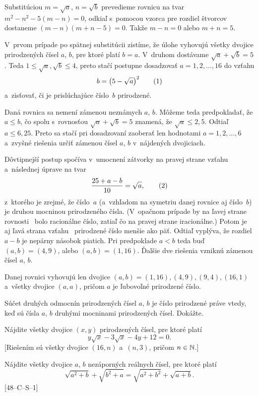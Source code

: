{%
Substitúciou $m=\sqrt a$, $n=\sqrt b$ prevedieme rovnicu na tvar
$m^2-n^2-5(m-n)=0$, odkiaľ s~pomocou vzorca pre rozdiel štvorcov
dostaneme $(m-n)(m+n-5)=0$. Takže $m-n=0$ alebo $m+n=5$.

V~prvom prípade po spätnej substitúcii zistíme, že úlohe vyhovujú
všetky dvojice prirodzených čísel $a$, $b$, pre ktoré platí $b=a$.
V~druhom dostávame $\sqrt a+\sqrt b=5$. Teda $1\le\sqrt a,\sqrt b\le4$,
preto stačí postupne dosadzovať $a=1,2,\dots,16$
do vzťahu
$$
b=\bigl(5-\sqrt a\bigr)^2 \tag1
$$
a~zisťovať, či je prislúchajúce číslo~$b$ prirodzené.

Daná rovnica sa nemení zámenou neznámych $a$, $b$. Môžeme teda
predpokladať, že $a\le b$, čo spolu s~rovnosťou $\sqrt a+\sqrt b=5$
znamená, že $\sqrt a\le2{,}5$. Odtiaľ $a\le6{,}25$. Preto sa stačí
pri dosadzovaní zaoberať len hodnotami $a=1,2,\dots,6$ a~zvyšné
riešenia určiť zámenou čísel $a$, $b$ v~nájdených dvojiciach.

Dôvtipnejší postup spočíva v~umocnení zátvorky na pravej strane
vzťahu~ a~následnej úprave na tvar
$$
{25+a-b\over10}=\sqrt a, \tag2
$$
z~ktorého je zrejmé, že číslo~$a$ (a~vzhľadom na symetriu danej
rovnice aj číslo~$b$) je druhou mocninou prirodzeného čísla.  
(V~opačnom prípade by na ľavej strane rovnosti~ bolo
racionálne číslo, zatiaľ čo na pravej strane iracionálne.) Potom je aj ľavá
strana vzťahu~ prirodzené číslo menšie ako päť. Odtiaľ vyplýva, že
rozdiel $a-b$ je nepárny násobok piatich. Pri predpoklade $a<b$ teda
buď $(a,b)=(4,9)$, alebo $(a,b)=(1,16)$. Ďalšie dve riešenia vzniknú
zámenou čísel $a$, $b$.

\zaver
Danej rovnici vyhovujú len dvojice $(a,b)=(1,16),(4,9),(9,4),(16,1)$
a~všetky dvojice $(a,a)$, pričom $a$ je ľubovoľné prirodzené číslo.


Súčet druhých odmocnín prirodzených čísel $a$, $b$ je číslo
prirodzené práve vtedy, keď sú čísla $a$, $b$ druhými mocninami
prirodzených čísel. Dokážte.

Nájdite všetky dvojice $(x,y)$ prirodzených čísel, pre ktoré platí
$$
y\sqrt x-3\sqrt x-4y+12=0.
$$
[Riešením sú všetky dvojice $(16,n)$ a~$(n,3)$, pričom $n\in\Bbb N$.]

Nájdite všetky dvojice $a$, $b$ nezáporných reálnych čísel, pre
ktoré platí
$$
\sqrt{a^2+b}+\sqrt{b^2+a}=\sqrt{a^2+b^2}+\sqrt{a+b}.
$$
[48--C--S--1]
}

